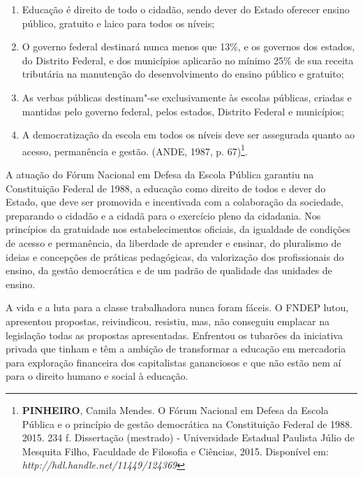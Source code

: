 \begin{enumerate}
\item{}Educação é direito de todo o cidadão, sendo dever do Estado
oferecer ensino público, gratuito e laico para todos os níveis;

\item{}O governo federal destinará nunca menos que 13\%, e os governos
dos estados, do Distrito Federal, e dos municípios aplicarão no mínimo
25\% de sua receita tributária na manutenção do desenvolvimento do
ensino público e gratuito;

\item{}As verbas públicas destinam"-se exclusivamente às escolas
públicas, criadas e mantidas pelo governo federal, pelos estados,
Distrito Federal e municípios;

\item{}A democratização da escola em todos os níveis deve ser
assegurada quanto ao acesso, permanência e gestão. (ANDE, 1987, p.
67)\footnote{\textbf{PINHEIRO}, Camila Mendes. O Fórum Nacional em
  Defesa da Escola Pública e o princípio de gestão democrática na
  Constituição Federal de 1988. 2015. 234 f. Dissertação (mestrado) -
  Universidade Estadual Paulista Júlio de Mesquita Filho, Faculdade de
  Filosofia e Ciências, 2015. Disponível em:
  \emph{http://hdl.handle.net/11449/124369}}.
\end{enumerate}

A atuação do Fórum Nacional em Defesa da Escola Pública garantiu na
Constituição Federal de 1988, a educação como direito de todos e dever
do Estado, que deve ser promovida e incentivada com a colaboração da
sociedade, preparando o cidadão e a cidadã para o exercício pleno da
cidadania. Nos princípios da gratuidade nos estabelecimentos oficiais,
da igualdade de condições de acesso e permanência, da liberdade de
aprender e ensinar, do pluralismo de ideias e concepções de práticas
pedagógicas, da valorização dos profissionais do ensino, da gestão
democrática e de um padrão de qualidade das unidades de ensino.

A vida e a luta para a classe trabalhadora nunca foram fáceis. O FNDEP
lutou, apresentou propostas, reivindicou, resistiu, mas, não conseguiu
emplacar na legislação todas as propostas apresentadas. Enfrentou os
tubarões da iniciativa privada que tinham e têm a ambição de transformar
a educação em mercadoria para exploração financeira dos capitalistas
gananciosos e que não estão nem aí para o direito humano e social à
educação.

